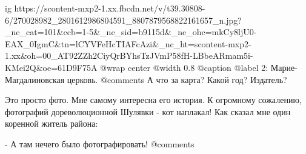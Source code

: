  
 
 
 
 

\ifcmt
  ig https://scontent-mxp2-1.xx.fbcdn.net/v/t39.30808-6/270028982_2801612986804591_8807879568822161657_n.jpg?_nc_cat=101&ccb=1-5&_nc_sid=b9115d&_nc_ohc=mkCy8ljU0-EAX_0IgmC&tn=lCYVFeHcTIAFcAzi&_nc_ht=scontent-mxp2-1.xx&oh=00_AT92ZZh2CiyQrBYhsTzJVmP58fH-LBbeARmam5i-KMei2Q&oe=61D9F75A
	@wrap center
  @width 0.8
	@caption @label 2: Марие-Магдалиновская церковь.
	@comments%
А что за карта? Какой год? Издатель?


Это просто фото. Мне самому интересна его история. К огромному сожалению,
фотографий дореволюционной Шулявки - кот наплакал! Как сказал мне один коренной
житель района:

- А там нечего было фотографировать!
	@comments%
\fi

